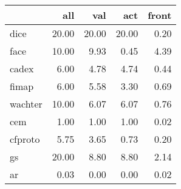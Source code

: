 \begin{tabular}{lrrrr}
\hline
{}                  &    all &    val &    act &  front \\ \hline
\hline
dice                &  20.00 &  20.00 &  20.00 &   0.20 \\ \hline
face                &  10.00 &   9.93 &   0.45 &   4.39 \\ \hline
cadex               &   6.00 &   4.78 &   4.74 &   0.44 \\ \hline
fimap               &   6.00 &   5.58 &   3.30 &   0.69 \\ \hline
wachter             &  10.00 &   6.07 &   6.07 &   0.76 \\ \hline
cem                 &   1.00 &   1.00 &   1.00 &   0.02 \\ \hline
cfproto             &   5.75 &   3.65 &   0.73 &   0.20 \\ \hline
gs                  &  20.00 &   8.80 &   8.80 &   2.14 \\ \hline
ar                  &   0.03 &   0.00 &   0.00 &   0.02 \\ \hline
\hline
\end{tabular}
